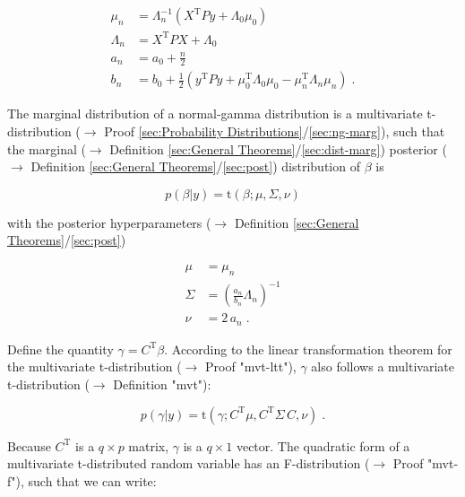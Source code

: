 \documentclass[a4paper,12pt,twoside]{book}
\begin{document}
\begin{equation} \label{eq:blr-pcr-GLM-NG-post-par}
\begin{split}
\mu_n &= \Lambda_n^{-1} (X^\mathrm{T} P y + \Lambda_0 \mu_0) \\
\Lambda_n &= X^\mathrm{T} P X + \Lambda_0 \\
a_n &= a_0 + \frac{n}{2} \\
b_n &= b_0 + \frac{1}{2} (y^\mathrm{T} P y + \mu_0^\mathrm{T} \Lambda_0 \mu_0 - \mu_n^\mathrm{T} \Lambda_n \mu_n) \; .
\end{split}
\end{equation}

The marginal distribution of a normal-gamma distribution is a multivariate t-distribution ($\rightarrow$ Proof \ref{sec:Probability Distributions}/\ref{sec:ng-marg}), such that the marginal ($\rightarrow$ Definition \ref{sec:General Theorems}/\ref{sec:dist-marg}) posterior ($\rightarrow$ Definition \ref{sec:General Theorems}/\ref{sec:post}) distribution of $\beta$ is

\begin{equation} \label{eq:blr-pcr-GLM-NG-post-beta}
p(\beta|y) = \mathrm{t}(\beta; \mu, \Sigma, \nu)
\end{equation}

with the posterior hyperparameters ($\rightarrow$ Definition \ref{sec:General Theorems}/\ref{sec:post})

\begin{equation} \label{eq:blr-pcr-GLM-NG-post-par-beta}
\begin{split}
\mu &= \mu_n \\
\Sigma &= \left( \frac{a_n}{b_n} \Lambda_n \right)^{-1} \\
\nu &= 2 \, a_n \; .
\end{split}
\end{equation}

Define the quantity $\gamma = C^\mathrm{T} \beta$. According to the linear transformation theorem for the multivariate t-distribution ($\rightarrow$ Proof "mvt-ltt"), $\gamma$ also follows a multivariate t-distribution ($\rightarrow$ Definition "mvt"):

\begin{equation} \label{eq:blr-pcr-GLM-NG-post-gamma}
p(\gamma|y) = \mathrm{t}(\gamma; C^\mathrm{T} \mu, C^\mathrm{T} \Sigma \, C, \nu) \; .
\end{equation}

Because $C^\mathrm{T}$ is a $q \times p$ matrix, $\gamma$ is a $q \times 1$ vector. The quadratic form of a multivariate t-distributed random variable has an F-distribution ($\rightarrow$ Proof "mvt-f"), such that we can write:
\end{document}

